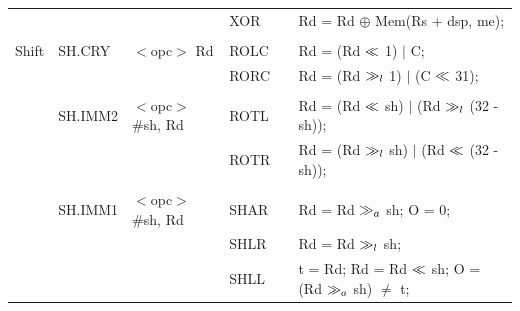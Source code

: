 \begin{table}
\begin{subtable}{\linewidth}
\begin{center}
\begin{tabular}{llllll}
                   &                   &                                       & XOR               & \flags{-**-}      & Rd = Rd $\oplus$ Mem(Rs + dsp, me);                                           \\
                   &                   &                                       &                   &                   &                                                                               \\
Shift              & SH.CRY            & $<$opc$>$ Rd                          & ROLC              & \flags{-***}      & Rd = (Rd $\ll$ 1) $\mid$ C;                                                  \\
                   &                   &                                       & RORC              & \flags{-***}      & Rd = (Rd $\gg_l$ 1) $\mid$ (C $\ll$ 31);                                      \\
                   &                   &                                       &                   &                   &                                                                               \\
                   & SH.IMM2           & $<$opc$>$ \#sh, Rd                    & ROTL              & \flags{-***}      & Rd = (Rd $\ll$ sh) $\mid$ (Rd $\gg_l$ (32 - sh));                             \\
                   &                   &                                       & ROTR              & \flags{-***}      & Rd = (Rd $\gg_l$ sh) $\mid$ (Rd $\ll$ (32 - sh));                             \\
                   &                   &                                       &                   &                   &                                                                               \\
                   & SH.IMM1           & $<$opc$>$ \#sh, Rd                    & SHAR              & \flags{!***}      & Rd = Rd $\gg_a$ sh; O = 0;                                                     \\
                   &                   &                                       & SHLR              & \flags{-***}      & Rd = Rd $\gg_l$ sh;                                                            \\
                   &                   &                                       & SHLL              & \flags{!***}      & t = Rd; Rd = Rd $\ll$ sh; O = (Rd $\gg_a$ sh) $\ne$ t;                        \\

\end{tabular}
\end{center}
\end{subtable}
\end{table}
